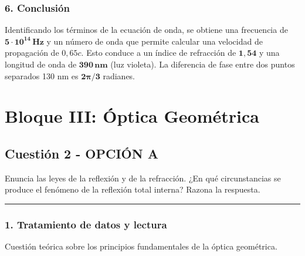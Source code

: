 \subsubsection*{6. Conclusión}
\begin{cajaconclusion}
    Identificando los términos de la ecuación de onda, se obtiene una frecuencia de $\mathbf{5 \cdot 10^{14} \, Hz}$ y un número de onda que permite calcular una velocidad de propagación de $0,65c$. Esto conduce a un índice de refracción de $\mathbf{1,54}$ y una longitud de onda de $\mathbf{390 \, nm}$ (luz violeta). La diferencia de fase entre dos puntos separados 130 nm es $\mathbf{2\pi/3}$ radianes.
\end{cajaconclusion}

\newpage

\section{Bloque III: Óptica Geométrica}
\label{sec:optica_2005_jun_cv}

\subsection{Cuestión 2 - OPCIÓN A}
\label{subsec:3A_2005_jun_cv}

\begin{cajaenunciado}
Enuncia las leyes de la reflexión y de la refracción. ¿En qué circunstancias se produce el fenómeno de la reflexión total interna? Razona la respuesta.
\end{cajaenunciado}
\hrule

\subsubsection*{1. Tratamiento de datos y lectura}
Cuestión teórica sobre los principios fundamentales de la óptica geométrica.

